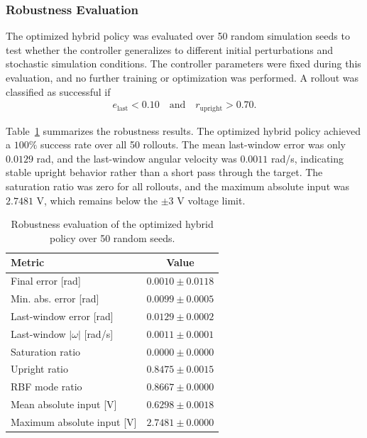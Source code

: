 \subsubsection{Robustness Evaluation}

The optimized hybrid policy was evaluated over 50 random simulation seeds to
test whether the controller generalizes to different initial perturbations and
stochastic simulation conditions. The controller parameters were fixed during
this evaluation, and no further training or optimization was performed. A
rollout was classified as successful if
\begin{equation}
\begin{aligned}
    e_{\mathrm{last}} < 0.10
    \quad \mathrm{and} \quad
    r_{\mathrm{upright}} > 0.70.
\end{aligned}
\label{eq:hybrid_success_condition}
\end{equation}

Table~\ref{tab:hybrid_robustness} summarizes the robustness results. The
optimized hybrid policy achieved a $100\%$ success rate over all 50 rollouts.
The mean last-window error was only $0.0129$ rad, and the last-window angular
velocity was $0.0011$ rad/s, indicating stable upright behavior rather than a
short pass through the target. The saturation ratio was zero for all rollouts,
and the maximum absolute input was $2.7481$ V, which remains below the
\(\pm 3\) V voltage limit.

\begin{table}[htbp]
    \caption{Robustness evaluation of the optimized hybrid policy over 50
    random seeds.}
    \centering
    \begin{tabular}{lc}
        \toprule
        Metric & Value \\
        \midrule
        Final error [rad] & $0.0010 \pm 0.0118$ \\
        Min. abs. error [rad] & $0.0099 \pm 0.0005$ \\
        Last-window error [rad] & $0.0129 \pm 0.0002$ \\
        Last-window $|\omega|$ [rad/s] & $0.0011 \pm 0.0001$ \\
        Saturation ratio & $0.0000 \pm 0.0000$ \\
        Upright ratio & $0.8475 \pm 0.0015$ \\
        RBF mode ratio & $0.8667 \pm 0.0000$ \\
        Mean absolute input [V] & $0.6298 \pm 0.0018$ \\
        Maximum absolute input [V] & $2.7481 \pm 0.0000$ \\
        \bottomrule
    \end{tabular}
    \label{tab:hybrid_robustness}
\end{table}

